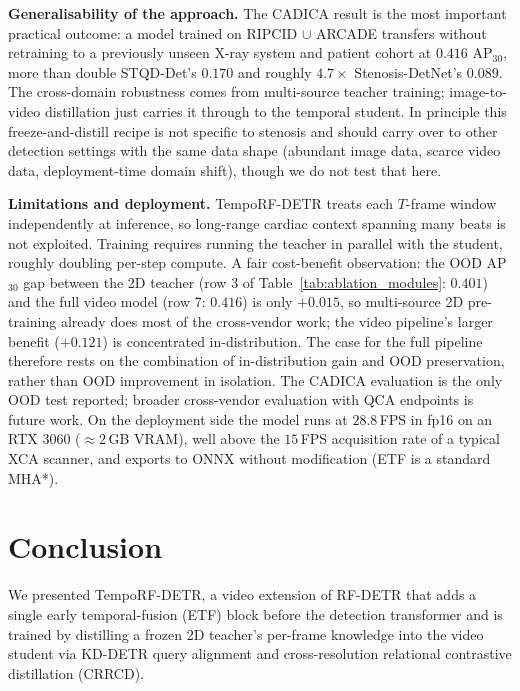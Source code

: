 \documentclass[conference]{IEEEtran}
\begin{document}
\textbf{Generalisability of the approach.} The CADICA result is the most important practical outcome: a model trained on RIPCID $\cup$ ARCADE transfers without retraining to a previously unseen X-ray system and patient cohort at $0.416$ AP$_{30}$, more than double STQD-Det's $0.170$ and roughly $4.7{\times}$ Stenosis-DetNet's $0.089$. The cross-domain robustness comes from multi-source teacher training; image-to-video distillation just carries it through to the temporal student. In principle this freeze-and-distill recipe is not specific to stenosis and should carry over to other detection settings with the same data shape (abundant image data, scarce video data, deployment-time domain shift), though we do not test that here.

\textbf{Limitations and deployment.} TempoRF-DETR treats each $T$-frame window independently at inference, so long-range cardiac context spanning many beats is not exploited. Training requires running the teacher in parallel with the student, roughly doubling per-step compute. A fair cost-benefit observation: the OOD AP$_{30}$ gap between the 2D teacher (row 3 of Table~\ref{tab:ablation_modules}: $0.401$) and the full video model (row 7: $0.416$) is only $+0.015$, so multi-source 2D pre-training already does most of the cross-vendor work; the video pipeline's larger benefit ($+0.121$) is concentrated in-distribution. The case for the full pipeline therefore rests on the combination of in-distribution gain and OOD preservation, rather than OOD improvement in isolation. The CADICA evaluation is the only OOD test reported; broader cross-vendor evaluation with QCA endpoints is future work. On the deployment side the model runs at $28.8$\,FPS in fp16 on an RTX 3060 ($\approx 2$\,GB VRAM), well above the $15$\,FPS acquisition rate of a typical XCA scanner, and exports to ONNX without modification (ETF is a standard MHA*).

\section{Conclusion}

We presented TempoRF-DETR, a video extension of RF-DETR that adds a single early temporal-fusion (ETF) block before the detection transformer and is trained by distilling a frozen 2D teacher's per-frame knowledge into the video student via KD-DETR query alignment and cross-resolution relational contrastive distillation (CRRCD).
\end{document}
